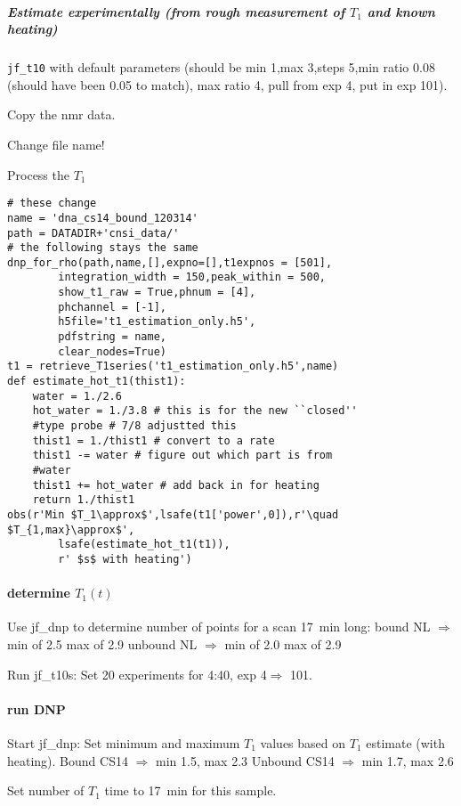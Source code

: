\subparagraph{Estimate experimentally (from rough measurement of $T_1$ and known heating)}
\texttt{jf\_t10} with default parameters (should be min 1,max 3,steps 5,min ratio 0.08 (should have been 0.05 to match), max ratio 4, pull from exp 4, put in exp 101).

Copy the nmr data.

Change file name!

Process the $T_1$


\begin{scriptsize}
\begin{lstlisting}
# these change
name = 'dna_cs14_bound_120314'
path = DATADIR+'cnsi_data/'
# the following stays the same
dnp_for_rho(path,name,[],expno=[],t1expnos = [501],
        integration_width = 150,peak_within = 500,
        show_t1_raw = True,phnum = [4],
        phchannel = [-1],
        h5file='t1_estimation_only.h5',
        pdfstring = name,
        clear_nodes=True)
t1 = retrieve_T1series('t1_estimation_only.h5',name)
def estimate_hot_t1(thist1):
    water = 1./2.6
    hot_water = 1./3.8 # this is for the new ``closed''
    #type probe # 7/8 adjustted this
    thist1 = 1./thist1 # convert to a rate
    thist1 -= water # figure out which part is from
    #water
    thist1 += hot_water # add back in for heating
    return 1./thist1
obs(r'Min $T_1\approx$',lsafe(t1['power',0]),r'\quad $T_{1,max}\approx$',
        lsafe(estimate_hot_t1(t1)),
        r' $s$ with heating')
\end{lstlisting}
\end{scriptsize}

\paragraph{determine $T_1(t)$}
Use jf\_dnp to determine number of points for a scan 17~min long:
bound NL $\Rightarrow$ min of 2.5 max of 2.9
unbound NL $\Rightarrow$ min of 2.0 max of 2.9

Run jf\_t10s:
Set 20 experiments for 4:40, exp 4$\Rightarrow$ 101.

\paragraph{run DNP}
Start jf\_dnp: Set minimum and maximum $T_1$ values based on $T_1$ estimate (with heating).
Bound CS14 $\Rightarrow$ min 1.5, max 2.3
Unbound CS14 $\Rightarrow$ min 1.7, max 2.6

Set number of $T_1$ time to 17~min for this sample.


